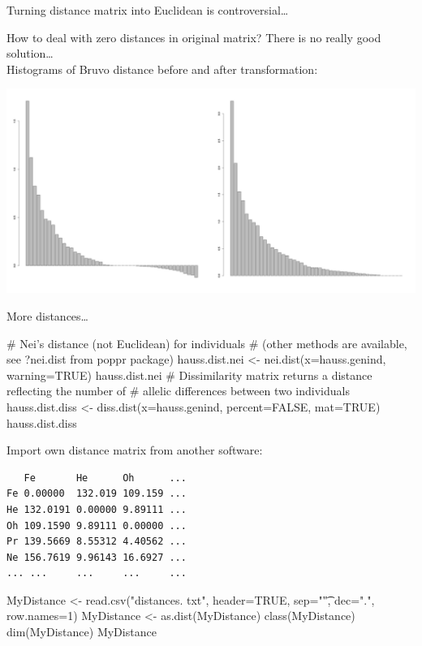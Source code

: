 \documentclass[compress, ucs, xelatex, 11pt, xcolor=svgnames,
  hyperref={
    bookmarks=true,
    unicode=true,
    colorlinks=true,
    pdftitle={Molecular data in R},
    plainpages=false,
    pdfauthor={Vojtech Zeisek},
    pdfsubject={Course about phylogeny and evolution in R},
    pdfcreator={XeLaTeX},
    pdfkeywords={R, evolution, phylogeny, molecular data},
    linkcolor=Tomato,
    anchorcolor=SaddleBrown,
    citecolor=Goldenrod,
    filecolor=DarkMagenta,
    menucolor=Sienna,
    urlcolor=DarkTurquoise,
    pdftex},
  url={hyphens, lowtilde} %
  ]{beamer}
\begin{document}
\begin{frame}{Turning distance matrix into Euclidean is controversial\ldots}
\begin{footnotesize}
  How to deal with zero distances in original matrix? There is no really good solution\ldots\\ Histograms of Bruvo distance before and after transformation:
\end{footnotesize}
\begin{center}
  \includegraphics[width=\textwidth]{bruvodist.png}
\end{center}
\end{frame}

\begin{frame}[fragile]{More distances\ldots}
  \begin{spluscode}
    # Nei's distance (not Euclidean) for individuals
    # (other methods are available, see ?nei.dist from poppr package)
    hauss.dist.nei <- nei.dist(x=hauss.genind, warning=TRUE)
    hauss.dist.nei
    # Dissimilarity matrix returns a distance reflecting the number of
    # allelic differences between two individuals
    hauss.dist.diss <- diss.dist(x=hauss.genind, percent=FALSE, mat=TRUE)
    hauss.dist.diss
  \end{spluscode}
\vfil
Import own distance matrix from another software:
\begin{multicols}{2}
  \begin{footnotesize}
    \begin{verbatim}
   Fe       He      Oh      ...
Fe 0.00000  132.019 109.159 ...
He 132.0191 0.00000 9.89111 ...
Oh 109.1590 9.89111 0.00000 ...
Pr 139.5669 8.55312 4.40562 ...
Ne 156.7619 9.96143 16.6927 ...
... ...     ...     ...     ...
    \end{verbatim}
  \end{footnotesize}
  \columnbreak
  \begin{spluscode}
    MyDistance <- read.csv("distances.
      txt", header=TRUE, sep="\t",
      dec=".", row.names=1)
    MyDistance <- as.dist(MyDistance)
    class(MyDistance)
    dim(MyDistance)
    MyDistance
  \end{spluscode}
\end{multicols}
\end{frame}
\end{document}
